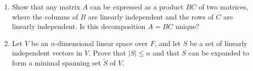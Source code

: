 \begin{problem}
\begin{enumerate}
  \item Show that any matrix $A$ can be expressed as a product $BC$ of two matrices, where the columns of $B$ are linearly independent and the rows of $C$ are linearly independent. Is this decomposition $A = BC$ unique?
  \item Let $V$ be an $n$-dimensional linear space over $F$, and let $S$ be a set of linearly independent vectors in $V$. Prove that $|S| \leq n$ and that $S$ can be expanded to form a minimal spanning set $\tilde{S}$ of $V$.
\end{enumerate}
\end{problem}